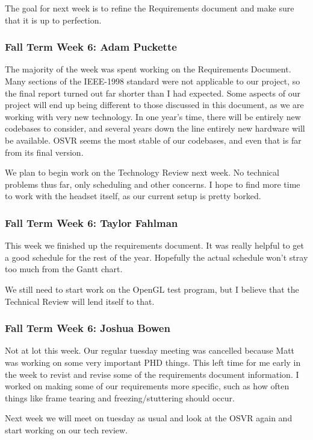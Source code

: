 \documentclass[draftclsnofoot,onecolumn]{IEEEtran}
\begin{document}
The goal for next week is to refine the Requirements document and make sure that it is up to perfection.

\subsubsection{Fall Term Week 6: Adam Puckette}

The majority of the week was spent working on the Requirements Document. Many sections of the IEEE-1998 standard were not applicable to our project, so the final report turned out far shorter than I had expected. Some aspects of our project will end up being different to those discussed in this document, as we are working with very new technology. In one year's time, there will be entirely new codebases to consider, and several years down the line entirely new hardware will be available. OSVR seems the most stable of our codebases, and even that is far from its final version.

We plan to begin work on the Technology Review next week. No technical problems thus far, only scheduling and other concerns. I hope to find more time to work with the headset itself, as our current setup is pretty borked.

\subsubsection{Fall Term Week 6: Taylor Fahlman}

This week we finished up the requirements document. It was really helpful to get a good schedule for the rest of the year. Hopefully the actual schedule won't stray too much from the Gantt chart.

We still need to start work on the OpenGL test program, but I believe that the Technical Review will lend itself to that.

\subsubsection{Fall Term Week 6: Joshua Bowen}

Not at lot this week. Our regular tuesday meeting was cancelled because Matt was working on some very important PHD things. This left time for me early in the week to revist and revise some of the requirements document information. I worked on making some of our requirements more specific, such as how often things like frame tearing and freezing/stuttering should occur.

Next week we will meet on tuesday as usual and look at the OSVR again and start working on our tech review.
\end{document}

